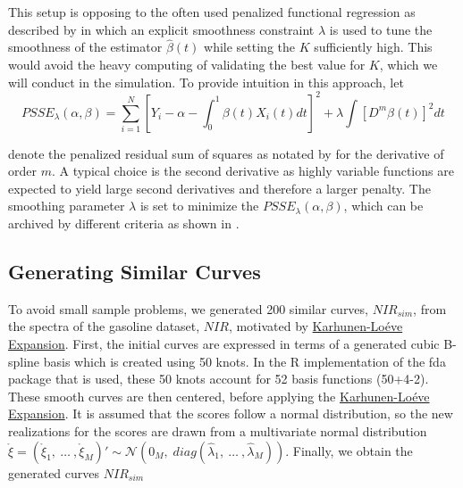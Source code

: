 \documentclass[11pt,twoside,a4paper]{article}
\begin{document}
	This setup is opposing to the often used penalized functional regression as described by \cite{Goldsmith_2011} in which an explicit smoothness constraint $\lambda$ is used to tune the smoothness of the estimator $\hat{\beta}(t)$ while setting the $K$ sufficiently high. This would avoid the heavy computing of validating the best value for $K$, which we will conduct in the simulation. To provide intuition in this approach, let 
	 \begin{equation}
	 	PSSE_\lambda(\alpha, \beta) = \sum_{i = 1}^{N} \left[ Y_i -\alpha -\int_0^1 \beta(t)X_i(t)dt \right]^2 + \lambda \int \left[D^m\beta(t)\right]^2 dt
	 \end{equation}
 
	 denote the penalized residual sum of squares as notated by \cite{ramsay_functional_2005} for the derivative of order $m$. A typical choice is the second derivative as highly variable functions are expected to yield large second derivatives and therefore a larger penalty. The smoothing parameter $\lambda$ is set to minimize the $PSSE_\lambda(\alpha, \beta)$, which can be archived by different criteria as shown in \cite{ThomasLee_2003}.
		
		
	
	\subsection{Generating Similar Curves}
	To avoid small sample problems, we generated 200 similar curves, $NIR_{sim}$, from the spectra of the gasoline dataset, $NIR$, motivated by \hyperlink{KL}{Karhunen-Lo\'{e}ve Expansion}. First, the initial curves are expressed in terms of a generated cubic B-spline basis which is created using 50 knots. In the R implementation of the fda package that is used, these 50 knots account for 52 basis functions (50+4-2). These smooth curves are then centered, before applying the \hyperlink{KL}{Karhunen-Lo\'{e}ve Expansion}. It is assumed that the scores follow a normal distribution, so the new realizations for the scores are drawn from a multivariate normal distribution $\mathring{\xi} = \left(\mathring{\xi}_{1},\: \dots \:, \mathring{\xi}_{M}\right)' \sim \mathcal{N}(0_M, \; diag(\hat{\lambda}_1,\: \dots\:, \hat{\lambda}_M))$. Finally, we obtain the generated curves $NIR_{sim}$
	
\end{document}

